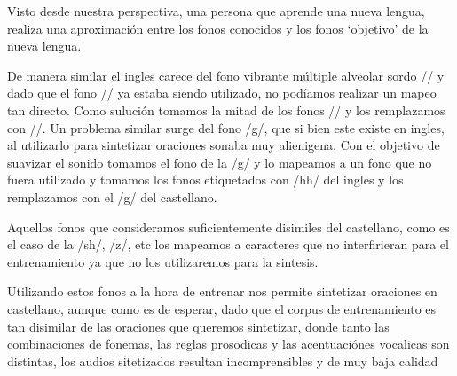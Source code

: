 Visto desde nuestra perspectiva, una persona que aprende una nueva lengua, realiza una aproximación entre los fonos conocidos y los fonos `objetivo' de la nueva lengua.

De manera similar el ingles carece del fono vibrante múltiple alveolar sordo // y dado que el fono // ya estaba siendo utilizado, no podíamos realizar un mapeo tan directo. Como sulución tomamos la mitad de los fonos // y los remplazamos con //. Un problema similar surge del fono /g/, que si bien este existe en ingles, al utilizarlo para sintetizar oraciones sonaba muy alienigena. Con el objetivo de suavizar el sonido tomamos el fono de la /g/ y lo mapeamos a un fono que no fuera utilizado y tomamos los fonos etiquetados con /hh/ del ingles y los remplazamos con el /g/ del castellano.

Aquellos fonos que consideramos suficientemente disimiles del castellano, como es el caso de la /sh/, /z/, etc los mapeamos a caracteres que no interfirieran para el entrenamiento ya que no los utilizaremos para la sintesis.

Utilizando estos fonos a la hora de entrenar nos permite sintetizar oraciones en castellano, aunque como es de esperar, dado que el corpus de entrenamiento es tan disimilar de las oraciones que queremos sintetizar, donde tanto las combinaciones de fonemas, las reglas prosodicas y las acentuaciónes vocalicas son distintas, los audios sitetizados resultan incomprensibles y de muy baja calidad

